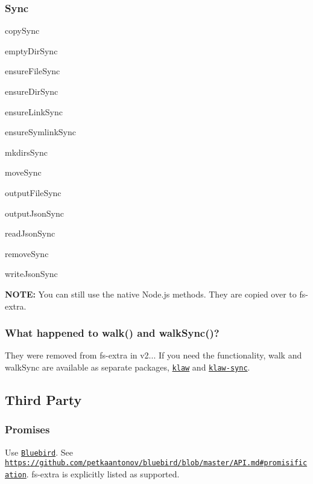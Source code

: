\subsubsection*{Sync}


\begin{DoxyItemize}
\item copy\+Sync
\item empty\+Dir\+Sync
\item ensure\+File\+Sync
\item ensure\+Dir\+Sync
\item ensure\+Link\+Sync
\item ensure\+Symlink\+Sync
\item mkdirs\+Sync
\item move\+Sync
\item output\+File\+Sync
\item output\+Json\+Sync
\item read\+Json\+Sync
\item remove\+Sync
\item write\+Json\+Sync
\end{DoxyItemize}

{\bfseries N\+O\+TE\+:} You can still use the native Node.\+js methods. They are copied over to {\ttfamily fs-\/extra}.

\subsubsection*{What happened to {\ttfamily walk()} and {\ttfamily walk\+Sync()}?}

They were removed from {\ttfamily fs-\/extra} in v2... If you need the functionality, {\ttfamily walk} and {\ttfamily walk\+Sync} are available as separate packages, \href{https://github.com/jprichardson/node-klaw}{\tt {\ttfamily klaw}} and \href{https://github.com/manidlou/node-klaw-sync}{\tt {\ttfamily klaw-\/sync}}.

\subsection*{Third Party }

\subsubsection*{Promises}

Use \href{https://github.com/petkaantonov/bluebird}{\tt Bluebird}. See \href{https://github.com/petkaantonov/bluebird/blob/master/API.md#promisification}{\tt https\+://github.\+com/petkaantonov/bluebird/blob/master/\+A\+P\+I.\+md\#promisification}. {\ttfamily fs-\/extra} is explicitly listed as supported.


